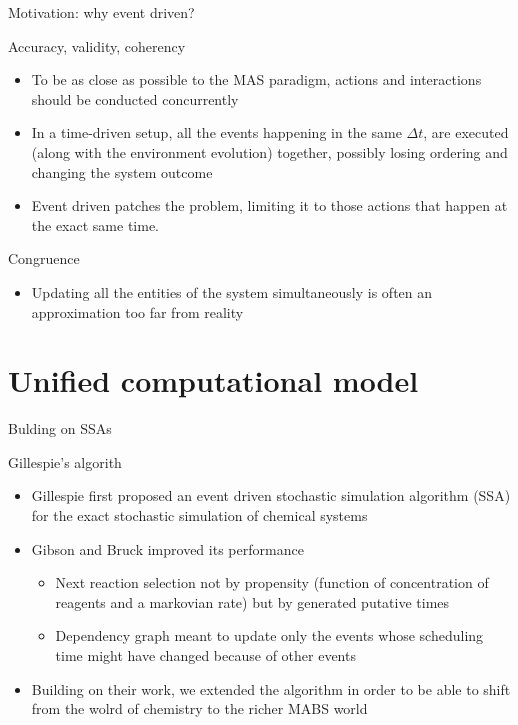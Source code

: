 \documentclass[presentation]{beamer} %
\begin{document}
\begin{frame}{Motivation: why event driven?}
  \begin{block}{Accuracy, validity, coherency}
    \begin{itemize}
      \item To be as close as possible to the MAS paradigm, actions and interactions should be conducted concurrently
      \item In a time-driven setup, all the events happening in the same $\Delta{}t$, are executed (along with the environment evolution) together, possibly losing ordering and changing the system outcome
      \item Event driven patches the problem, limiting it to those actions that happen at the exact same time.
    \end{itemize}
  \end{block}
  \begin{block}{Congruence}
    \begin{itemize}
      \item Updating all the entities of the system simultaneously is often an approximation too far from reality
    \end{itemize}
  \end{block}
\end{frame}

\section{Unified computational model}

\begin{frame}{Bulding on SSAs}
  \begin{block}{Gillespie's algorith}
    \begin{itemize}
      \item Gillespie \cite{gillespie1977} first proposed an event driven stochastic simulation algorithm (SSA) for the exact stochastic simulation of chemical systems
      \item Gibson and Bruck \cite{gibson2000} improved its performance
      \begin{itemize}
	\item Next reaction selection not by propensity (function of concentration of reagents and a markovian rate) but by generated putative times
	\item Dependency graph meant to update only the events whose scheduling time might have changed because of other events
      \end{itemize}
      \item Building on their work, we extended the algorithm in order to be able to shift from the wolrd of chemistry to the richer MABS world
    \end{itemize}
  \end{block}
\end{frame}
\end{document}
